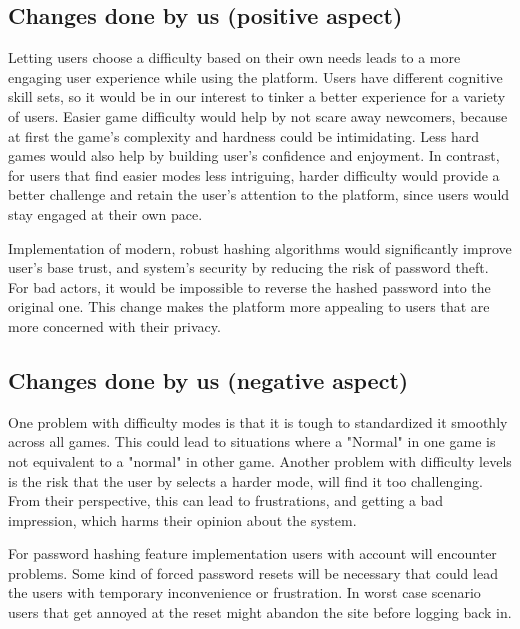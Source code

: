 \documentclass[11pt,a4paper]{article}
\begin{document}

\subsection{Changes done by us (positive aspect)}

Letting users choose a difficulty based on their own needs leads to a more engaging user experience while using the platform. Users have different cognitive skill sets, so it would be in our interest to tinker a better experience for a variety of users. Easier game difficulty would help by not scare away newcomers, because at first the game's complexity and hardness could be intimidating. Less hard games would also help by building user's confidence and enjoyment. In contrast, for users that find easier modes less intriguing, harder difficulty would provide a better challenge and retain the user's attention to the platform, since users would stay engaged at their own pace.

Implementation of modern, robust hashing algorithms would significantly improve user's base trust, and system's security by reducing the risk of password theft. For bad actors, it would be impossible to reverse the hashed password into the original one. This change makes the platform more appealing to users that are more concerned with their privacy. 


\subsection{Changes done by us (negative aspect)}

One problem with difficulty modes is that it is tough to standardized it smoothly across all games. This could lead to situations where a "Normal" in one game is not equivalent to a "normal" in other game. Another problem with difficulty levels is the risk that the user by selects a harder mode, will find it too challenging. From their perspective, this can lead to frustrations, and getting a bad impression, which harms their opinion about the system.

For password hashing feature implementation users with account will encounter problems. Some kind of forced password resets will be necessary that could lead the users with temporary inconvenience or frustration. In worst case scenario users that get annoyed at the reset might abandon the site before logging back in.
\end{document}
